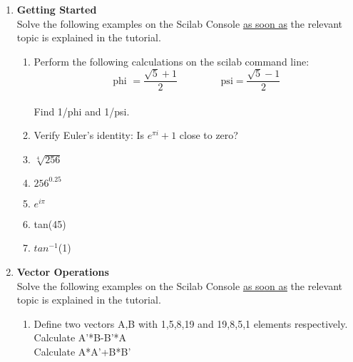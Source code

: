 \documentclass[12pt,a4paper]{article}
\newenvironment{enumcpt}{\begin{enumerate} \topsep -3mm \partopsep -3mm 
                        \parsep -3mm
                        \itemsep -0mm \leftmargin -1in \rightmargin -3mm
                        }{\end{enumerate}}
\begin{document}
\begin{multicols}{2}
\begin{enumcpt}
\item {\bf Getting Started }\\Solve the following examples on the Scilab Console \underline {as soon as} the relevant topic is explained in the tutorial.
	\begin{enumcpt}
	\item Perform the following calculations on the scilab command line:
\[
\mbox{phi } = \frac{\sqrt{5}+1}{2} \qquad \qquad \mbox{ psi} = \frac{\sqrt{5}-1}{2}
\]
\\Find 1/phi and 1/psi.

\item Verify Euler's identity: Is $e^{\pi i}+ 1$ close to zero?\\
\item $\sqrt[4]{256}$
\item $256^{0.25}$
\item $e^{i\pi}$
\item tan(45)
\item $tan^{-1}$(1)
\end{enumcpt}

\item {\bf Vector Operations}\\Solve the following examples on the Scilab Console \underline {as soon as} the relevant topic is explained in the tutorial.
\begin{enumcpt}
\item Define two vectors A,B with 1,5,8,19 and 19,8,5,1 elements respectively.\\
Calculate A’*B-B’*A\\
Calculate A*A’+B*B’


\end{enumcpt}
\end{enumcpt}
\end{multicols}
\end{document}
